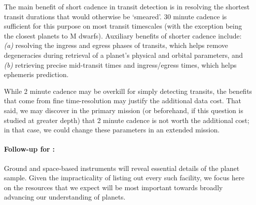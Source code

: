 The main benefit of short cadence in transit detection is in resolving the shortest transit durations that would otherwise be `smeared'.
30 minute cadence is sufficient for this purpose on most transit timescales (with the exception being the closest planets to M dwarfs).
Auxiliary benefits of shorter cadence include: \textit{(a)} resolving the ingress and egress phases of transits, which helps remove degeneracies during retrieval of a planet's physical and orbital parameters, and \textit{(b)} retrieving precise mid-transit times and ingress/egress times, which helps ephemeris prediction.
   

While 2 minute cadence may be overkill for simply detecting transits, the benefits that come from fine time-resolution may justify the additional data cost.
That said, we may discover in the primary mission (or beforehand, if this question is studied at greater depth) that 2 minute cadence is not worth the additional cost; in that case, we could change these parameters in an extended mission.


\paragraph{Follow-up for \tess:}
Ground and space-based instruments will reveal essential details of the \tess planet sample.
Given the impracticality of listing out every such facility, we focus here on the resources that we expect will be most important towards broadly advancing our understanding of \tesss planets.

